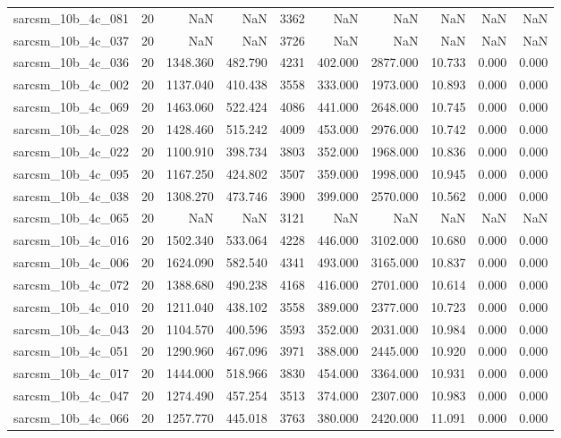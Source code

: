 \begin{tabular}{lrrrrrrrrr}
sarcsm\_10b\_4c\_081 & 20 & NaN & NaN & 3362 & NaN & NaN & NaN & NaN & NaN \\
sarcsm\_10b\_4c\_037 & 20 & NaN & NaN & 3726 & NaN & NaN & NaN & NaN & NaN \\
sarcsm\_10b\_4c\_036 & 20 & 1348.360 & 482.790 & 4231 & 402.000 & 2877.000 & 10.733 & 0.000 & 0.000 \\
sarcsm\_10b\_4c\_002 & 20 & 1137.040 & 410.438 & 3558 & 333.000 & 1973.000 & 10.893 & 0.000 & 0.000 \\
sarcsm\_10b\_4c\_069 & 20 & 1463.060 & 522.424 & 4086 & 441.000 & 2648.000 & 10.745 & 0.000 & 0.000 \\
sarcsm\_10b\_4c\_028 & 20 & 1428.460 & 515.242 & 4009 & 453.000 & 2976.000 & 10.742 & 0.000 & 0.000 \\
sarcsm\_10b\_4c\_022 & 20 & 1100.910 & 398.734 & 3803 & 352.000 & 1968.000 & 10.836 & 0.000 & 0.000 \\
sarcsm\_10b\_4c\_095 & 20 & 1167.250 & 424.802 & 3507 & 359.000 & 1998.000 & 10.945 & 0.000 & 0.000 \\
sarcsm\_10b\_4c\_038 & 20 & 1308.270 & 473.746 & 3900 & 399.000 & 2570.000 & 10.562 & 0.000 & 0.000 \\
sarcsm\_10b\_4c\_065 & 20 & NaN & NaN & 3121 & NaN & NaN & NaN & NaN & NaN \\
sarcsm\_10b\_4c\_016 & 20 & 1502.340 & 533.064 & 4228 & 446.000 & 3102.000 & 10.680 & 0.000 & 0.000 \\
sarcsm\_10b\_4c\_006 & 20 & 1624.090 & 582.540 & 4341 & 493.000 & 3165.000 & 10.837 & 0.000 & 0.000 \\
sarcsm\_10b\_4c\_072 & 20 & 1388.680 & 490.238 & 4168 & 416.000 & 2701.000 & 10.614 & 0.000 & 0.000 \\
sarcsm\_10b\_4c\_010 & 20 & 1211.040 & 438.102 & 3558 & 389.000 & 2377.000 & 10.723 & 0.000 & 0.000 \\
sarcsm\_10b\_4c\_043 & 20 & 1104.570 & 400.596 & 3593 & 352.000 & 2031.000 & 10.984 & 0.000 & 0.000 \\
sarcsm\_10b\_4c\_051 & 20 & 1290.960 & 467.096 & 3971 & 388.000 & 2445.000 & 10.920 & 0.000 & 0.000 \\
sarcsm\_10b\_4c\_017 & 20 & 1444.000 & 518.966 & 3830 & 454.000 & 3364.000 & 10.931 & 0.000 & 0.000 \\
sarcsm\_10b\_4c\_047 & 20 & 1274.490 & 457.254 & 3513 & 374.000 & 2307.000 & 10.983 & 0.000 & 0.000 \\
sarcsm\_10b\_4c\_066 & 20 & 1257.770 & 445.018 & 3763 & 380.000 & 2420.000 & 11.091 & 0.000 & 0.000 \\

\end{tabular}

